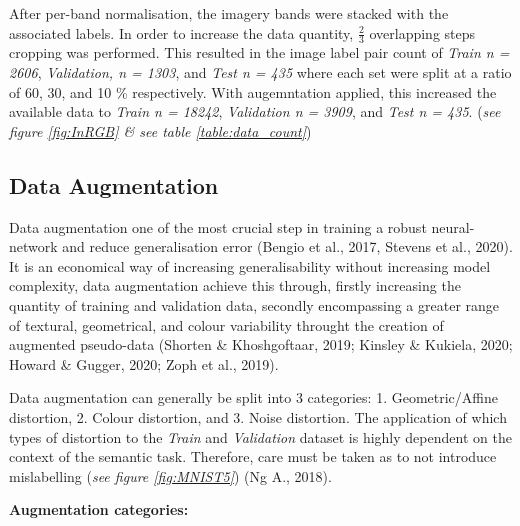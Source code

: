 \documentclass[11pt, a4paper, twoside]{report}
\begin{document}
After per-band normalisation, the imagery bands were stacked with the associated labels. In order to increase the data quantity, $\frac{2}{3}$ overlapping steps cropping was performed. This resulted in the image label pair count of \textit{Train n = 2606}, \textit{Validation, n = 1303}, and \textit{Test n = 435} where each set were split at a ratio of 60, 30, and 10 \% respectively. With augemntation applied, this increased the available data to \textit{Train n = 18242}, \textit{Validation n = 3909}, and \textit{Test n = 435}. (\textit{see figure \ref{fig:InRGB} \& see table \ref{table:data_count}})\\\par
\subsection{Data Augmentation}\label{DataAug}

Data augmentation one of the most crucial step in training a robust neural-network and reduce generalisation error (Bengio et al., 2017, Stevens et al., 2020). It is an economical way of increasing generalisability without increasing model complexity, data augmentation achieve this through, firstly increasing the quantity of training and validation data, secondly encompassing a greater range of textural, geometrical, and colour variability throught the creation of augmented pseudo-data (Shorten \& Khoshgoftaar, 2019; Kinsley \& Kukiela, 2020; Howard \& Gugger, 2020; Zoph et al., 2019).\\\par

Data augmentation can generally be split into 3 categories: 1. Geometric/Affine distortion, 2. Colour distortion, and 3. Noise distortion. The application of which types of distortion to the \textit{Train} and \textit{Validation} dataset is highly dependent on the context of the semantic task. Therefore, care must be taken as to not introduce mislabelling (\textit{see figure \ref{fig:MNIST5}}) (Ng A., 2018).\\\par

\textbf{Augmentation categories:}
\end{document}
